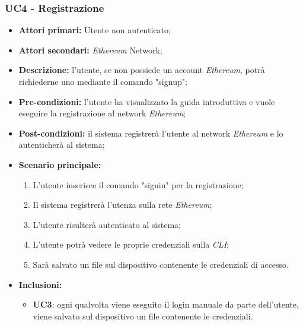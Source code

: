 \subsubsection{UC4 - Registrazione}
\begin{itemize}
	\item \textbf{Attori primari:} Utente non autenticato;
	\item \textbf{Attori secondari:} \textit{Ethereum\glo} Network;
	\item \textbf{Descrizione:} l'utente, se non possiede un account \textit{Ethereum\glos}, potrà richiederne uno mediante il comando "signup"; 
	\item \textbf{Pre-condizioni:} l'utente ha visualizzato la guida introduttiva e vuole eseguire la registrazione al network \textit{Ethereum\glos};
	\item \textbf{Post-condizioni:} il sistema registrerà l'utente al network \textit{Ethereum\glo} e lo autenticherà al sistema;
	\item \textbf{Scenario principale:} 
	\begin{enumerate}
		\item L'utente inserisce il comando "signin" per la registrazione;
		\item Il sistema registrerà l'utenza sulla rete \textit{Ethereum\glos};
		\item L'utente risulterà autenticato al sistema;
		\item L'utente potrà vedere le proprie credenziali sulla \textit{CLI\glos};
		\item Sarà salvato un file sul dispositivo contenente le credenziali di accesso.
	\end{enumerate}
	\item \textbf{Inclusioni:}
	\begin{itemize}
		\item\textbf{UC3}: ogni qualvolta viene eseguito il login manuale da parte dell'utente, viene salvato sul dispositivo un file contenente le credenziali.
	\end{itemize} 
\end{itemize}